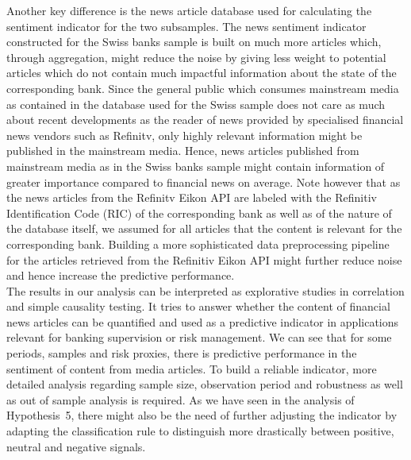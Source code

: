 Another key difference is the news article database used for calculating the sentiment indicator for the two subsamples. The news sentiment indicator constructed for the Swiss banks sample is built on much more articles which, through aggregation, might reduce the noise by giving less weight to potential articles which do not contain much impactful information about the state of the corresponding bank. Since the general public which consumes mainstream media as contained in the database used for the Swiss sample does not care as much about recent developments as the reader of news provided by specialised financial news vendors such as Refinitv, only highly relevant information might be published in the mainstream media. Hence, news articles published from mainstream media as in the Swiss banks sample might contain information of greater importance compared to financial news on average. Note however that as the news articles from the Refinitv Eikon API are labeled with the Refinitiv Identification Code (RIC) of the corresponding bank as well as of the nature of the database itself, we assumed for all articles that the content is relevant for the corresponding bank. Building a more sophisticated data preprocessing pipeline for the articles retrieved from the Refinitiv Eikon API might further reduce noise and hence increase the predictive performance. \\

The results in our analysis can be interpreted as explorative studies in correlation and simple causality testing. It tries to answer whether the content of financial news articles can be quantified and used as a predictive indicator in applications relevant for banking supervision or risk management. We can see that for some periods, samples and risk proxies, there is predictive performance in the sentiment of content from media articles. To build a reliable indicator, more detailed analysis regarding sample size, observation period and robustness as well as out of sample analysis is required. As we have seen in the analysis of \mbox{Hypothesis~5}, there might also be the need of further adjusting the indicator by adapting the classification rule to distinguish more drastically between positive, neutral and negative signals. \\

